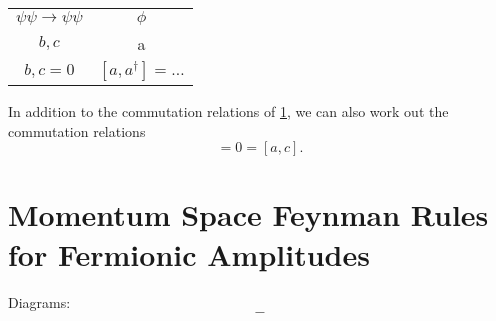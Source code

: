 
\begin{table}[htpb]
  \centering
  \begin{tabular}{c c}
  $\psi\psi \to \psi\psi$ &  $\phi$ \\
  $b, c$ & a \\
  ${b, c} = 0$ & $[a, a^{\dagger}] = \dots$ \\
  \end{tabular}
  \caption{}
  \label{tab:18-1}
\end{table}

In addition to the commutation relations of \ref{tab:18-1}, we can also work out the commutation relations 
\begin{equation}
  [a, b] = 0 = [a, c].
\end{equation}

\section{Momentum Space Feynman Rules for Fermionic Amplitudes}%
\label{sec:momentum_space_feynman_rules_for_fermionic_amplitudes}

Diagrams:
\begin{equation}
  -
\end{equation}

